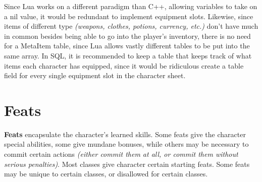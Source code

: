 \documentclass[openany,11pt,a4paper]{book}
\begin{document}
Since Lua works on a different paradigm than C++, allowing variables to take on a nil value, it would be redundant to implement equipment slots. Likewise, since items of different type \textit{(weapons, clothes, potions, currency, etc.)} don't have much in common besides being able to go into the player's inventory, there is no need for a MetaItem table, since Lua allows vastly different tables to be put into the same array. In SQL, it is recommended to keep a table that keeps track of what items each character has equipped, since it would be ridiculous create a table field for every single equipment slot in the character sheet.
\section{Feats}
\textbf{Feats} encapsulate the character's learned skills. Some feats give the character special abilities, some give mundane bonuses, while others may be necessary to commit certain actions \textit{(either commit them at all, or commit them without serious penalties)}. Most classes give character certain starting feats. Some feats may be unique to certain classes, or disallowed for certain classes.
\end{document}
